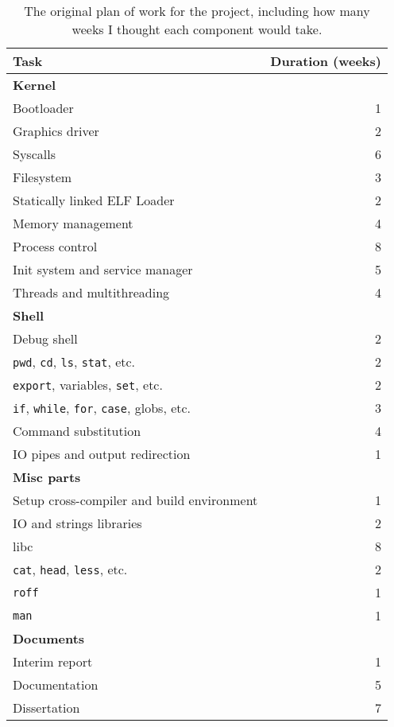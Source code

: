\documentclass{article}
\begin{document}
\begin{table}[tbp]
\begin{center}
\begin{tabular}{|l|r|}
    \hline
    Task & Duration (weeks)\\
    \hline \textbf{Kernel} &\\
    Bootloader & 1\\
    Graphics driver & 2\\
    Syscalls & 6\\
    Filesystem & 3\\
    Statically linked ELF Loader & 2\\
    Memory management & 4\\
    Process control & 8\\
    Init system and service manager & 5\\
    Threads and multithreading & 4\\
    \hline \textbf{Shell} &\\
    Debug shell & 2\\
    \texttt{pwd}, \texttt{cd}, \texttt{ls}, \texttt{stat}, etc. & 2\\
    \texttt{export}, variables, \texttt{set}, etc. & 2\\
    \texttt{if}, \texttt{while}, \texttt{for}, \texttt{case}, globs, etc. & 3\\
    Command substitution & 4\\
    IO pipes and output redirection & 1\\
    \hline \textbf{Misc parts} &\\
    Setup cross-compiler and build environment & 1\\
    IO and strings libraries & 2\\
    libc & 8\\
    \texttt{cat}, \texttt{head}, \texttt{less}, etc. & 2\\
    \texttt{roff} & 1\\
    \texttt{man} & 1\\
    \hline \textbf{Documents} &\\
    Interim report & 1\\
    Documentation & 5\\
    Dissertation & 7\\
    \hline
\end{tabular}
\caption{The original plan of work for the project, including how many weeks I
thought each component would take.}
\label{tab:original-work-plan}
\end{center}
\end{table}
\end{document}
